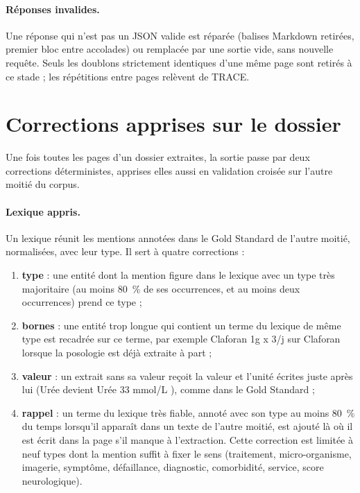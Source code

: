 \paragraph{Réponses invalides.}\label{sec:c4-postproc} Une réponse qui n'est pas un JSON valide est réparée (balises Markdown retirées, premier bloc entre accolades) ou remplacée par une sortie vide, sans nouvelle requête. Seuls les doublons strictement identiques d'une même page sont retirés à ce stade ; les répétitions entre pages relèvent de TRACE.

\section{Corrections apprises sur le dossier}\label{sec:c4-appris}

Une fois toutes les pages d'un dossier extraites, la sortie passe par deux corrections déterministes, apprises elles aussi en validation croisée sur l'autre moitié du corpus.

\paragraph{Lexique appris.} Un lexique réunit les mentions annotées dans le Gold Standard de l'autre moitié, normalisées, avec leur type. Il sert à quatre corrections :
\begin{enumerate}
  \item \textbf{type} : une entité dont la mention figure dans le lexique avec un type très majoritaire (au moins 80~\% de ses occurrences, et au moins deux occurrences) prend ce type ;
  \item \textbf{bornes} : une entité trop longue qui contient un terme du lexique de même type est recadrée sur ce terme, par exemple \og Claforan 1g x 3/j \fg{} sur \og Claforan \fg{} lorsque la posologie est déjà extraite à part ;
  \item \textbf{valeur} : un  extrait sans sa valeur reçoit la valeur et l'unité écrites juste après lui (\og Urée \fg{} devient \og Urée 33 mmol/L \fg{}), comme dans le Gold Standard ;
  \item \textbf{rappel} : un terme du lexique très fiable, annoté avec son type au moins 80~\% du temps lorsqu'il apparaît dans un texte de l'autre moitié, est ajouté là où il est écrit dans la page s'il manque à l'extraction. Cette correction est limitée à neuf types dont la mention suffit à fixer le sens (traitement, micro-organisme, imagerie, symptôme, défaillance, diagnostic, comorbidité, service, score neurologique).
\end{enumerate}

